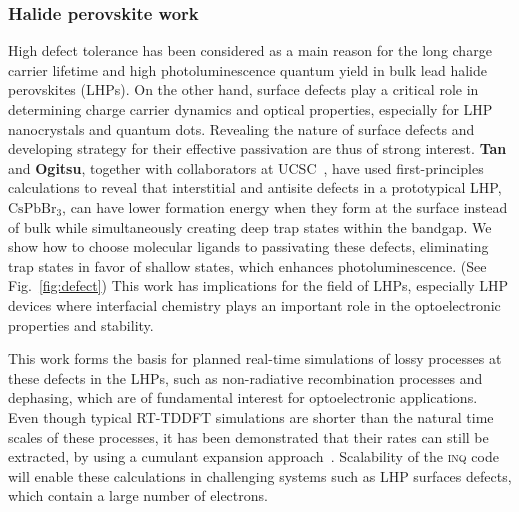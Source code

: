 \subsubsection{Halide perovskite work}

High defect tolerance has been considered as a main reason for the long charge carrier lifetime and high photoluminescence quantum yield in bulk lead halide perovskites (LHPs). 
On the other hand, surface defects play a critical role in determining charge carrier dynamics and optical properties, especially for LHP nanocrystals and quantum dots. Revealing the nature of surface defects and developing strategy for their effective passivation are thus of strong interest. 
{\bf Tan} and {\bf Ogitsu}, together with collaborators at UCSC~\cite{Smart2021}, have used first-principles calculations to reveal that interstitial and antisite defects in a prototypical LHP, \(\mathrm{CsPbBr_3}\), can have lower formation energy when they form at the surface instead of bulk while simultaneously creating deep trap states within the bandgap.
We show how to choose molecular ligands to passivating these defects, eliminating trap states in favor of shallow states, which enhances photoluminescence. 
(See Fig.~\ref{fig:defect}) This work has implications for  the field of LHPs, especially LHP devices where interfacial chemistry plays an important role in the optoelectronic properties and stability.

This work forms the basis for planned real-time simulations of lossy processes at these defects in the LHPs, such as non-radiative recombination processes and dephasing, which are of fundamental interest for optoelectronic applications. 
Even though typical RT-TDDFT simulations are shorter than the natural time scales of these processes, it has been demonstrated that their rates can still be extracted, by using a cumulant expansion approach~\cite{Qiao2020}. 
Scalability of the \textsc{inq} code will enable these calculations in challenging systems such as LHP surfaces defects, which contain a large number of electrons.     


